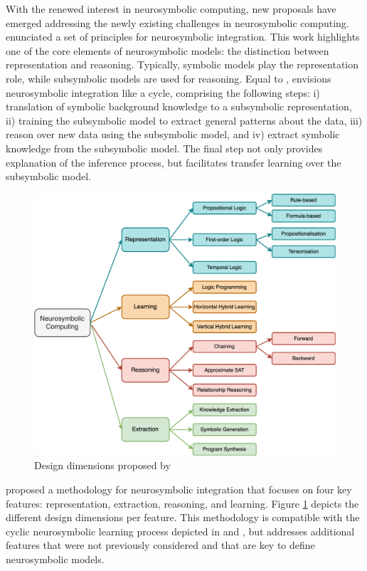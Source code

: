 With the renewed interest in neurosymbolic computing, new proposals have emerged addressing the newly existing challenges in neurosymbolic computing. \cite{besold_neural-symbolic_2017} enunciated a set of principles for neurosymbolic integration. This work highlights one of the core elements of neurosymbolic models: the distinction between representation and reasoning. Typically, symbolic models play the representation role, while subsymbolic models are used for reasoning. Equal to \cite{bader_dimensions_2005}, \cite{besold_neural-symbolic_2017} envisions neurosymbolic integration like a cycle, comprising the following steps: i) translation of symbolic background knowledge to a subsymbolic representation, ii) training the subsymbolic model to extract general patterns about the data, iii) reason over new data using the subsymbolic model, and iv) extract symbolic knowledge from the subsymbolic model. The final step not only provides explanation of the inference process, but facilitates transfer learning over the subsymbolic model.

\begin{figure}[ht]
    \centering
    \includegraphics[width=.85\linewidth]{2_stateoftheart/figures/garcez_design.eps}
    \caption{Design dimensions proposed by \cite{garcez_neural-symbolic_2019}}
    \label{fig:garcez_design}
\end{figure}

\cite{garcez_neural-symbolic_2019} proposed a methodology for neurosymbolic integration that focuses on four key features: representation, extraction, reasoning, and learning. Figure \ref{fig:garcez_design} depicts the different design dimensions per feature. This methodology is compatible with the cyclic neurosymbolic learning process depicted in \cite{bader_dimensions_2005} and \cite{besold_neural-symbolic_2017}, but addresses additional features that were not previously considered and that are key to define neurosymbolic models.

